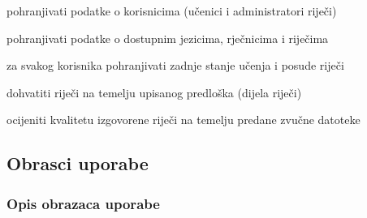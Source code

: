 \begin{packed_enum}
\begin{packed_enum}
				\end{packed_enum}
				
				\item  {}
				
				\begin{packed_enum}
					
					\item pohranjivati podatke o korisnicima (učenici i administratori riječi)
					\item pohranjivati podatke o dostupnim jezicima, rječnicima i riječima
					\item za svakog korisnika pohranjivati zadnje stanje učenja i posude riječi
					
				\end{packed_enum}
				
				\item  {}
				
				\begin{packed_enum}
					
					\item dohvatiti riječi na temelju upisanog predloška (dijela riječi)
					
				\end{packed_enum}
				
				\item  {}
				
				\begin{packed_enum}
					
					\item ocijeniti kvalitetu izgovorene riječi na temelju predane zvučne datoteke
					
				\end{packed_enum}
				
			\end{packed_enum}
			
			\eject 
			
			
				
			\subsection{Obrasci uporabe}
				
				
				\subsubsection{Opis obrazaca uporabe}
					


